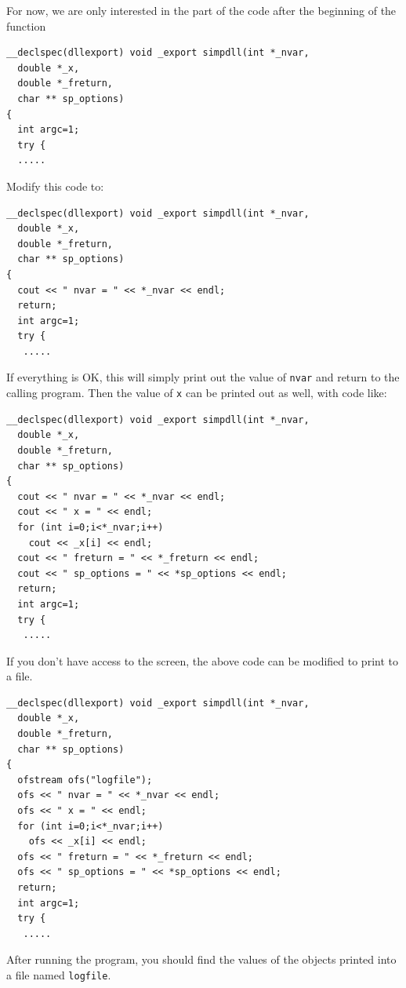 For now, we are only interested in the 
part of the code after the beginning of the function
\begin{lstlisting}
__declspec(dllexport) void _export simpdll(int *_nvar,
  double *_x,
  double *_freturn,
  char ** sp_options)
{
  int argc=1;
  try {
  .....
\end{lstlisting}
Modify this code to:
\begin{lstlisting}
__declspec(dllexport) void _export simpdll(int *_nvar,
  double *_x,
  double *_freturn,
  char ** sp_options)
{
  cout << " nvar = " << *_nvar << endl;
  return; 
  int argc=1;
  try {
   .....
\end{lstlisting}
If everything is OK, this will simply print out the value of \texttt{nvar}
and return to the calling program.
Then the value of \texttt{x} can be printed out as well, with code like:
\begin{lstlisting}
__declspec(dllexport) void _export simpdll(int *_nvar,
  double *_x,
  double *_freturn,
  char ** sp_options)
{
  cout << " nvar = " << *_nvar << endl;
  cout << " x = " << endl;
  for (int i=0;i<*_nvar;i++)
    cout << _x[i] << endl;
  cout << " freturn = " << *_freturn << endl;
  cout << " sp_options = " << *sp_options << endl;
  return; 
  int argc=1;
  try {
   .....
\end{lstlisting}
If you don't have access to the screen, the above code can be modified to print to a file.
\begin{lstlisting}
__declspec(dllexport) void _export simpdll(int *_nvar,
  double *_x,
  double *_freturn,
  char ** sp_options)
{
  ofstream ofs("logfile");
  ofs << " nvar = " << *_nvar << endl;
  ofs << " x = " << endl;
  for (int i=0;i<*_nvar;i++)
    ofs << _x[i] << endl;
  ofs << " freturn = " << *_freturn << endl;
  ofs << " sp_options = " << *sp_options << endl;
  return; 
  int argc=1;
  try {
   .....
\end{lstlisting}
After running the program, you should find the values of the 
objects printed into a file named \texttt{logfile}.

